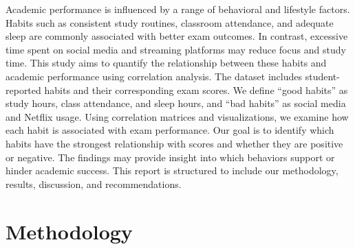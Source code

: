 \documentclass[
  11pt,
  a4paper,
]{article}
\begin{document}
Academic performance is influenced by a range of behavioral and
lifestyle factors. Habits such as consistent study routines, classroom
attendance, and adequate sleep are commonly associated with better exam
outcomes. In contrast, excessive time spent on social media and
streaming platforms may reduce focus and study time. This study aims to
quantify the relationship between these habits and academic performance
using correlation analysis. The dataset includes student-reported habits
and their corresponding exam scores. We define ``good habits'' as study
hours, class attendance, and sleep hours, and ``bad habits'' as social
media and Netflix usage. Using correlation matrices and visualizations,
we examine how each habit is associated with exam performance. Our goal
is to identify which habits have the strongest relationship with scores
and whether they are positive or negative. The findings may provide
insight into which behaviors support or hinder academic success. This
report is structured to include our methodology, results, discussion,
and recommendations.

\newpage

\section{Methodology}\label{methodology}
\end{document}

